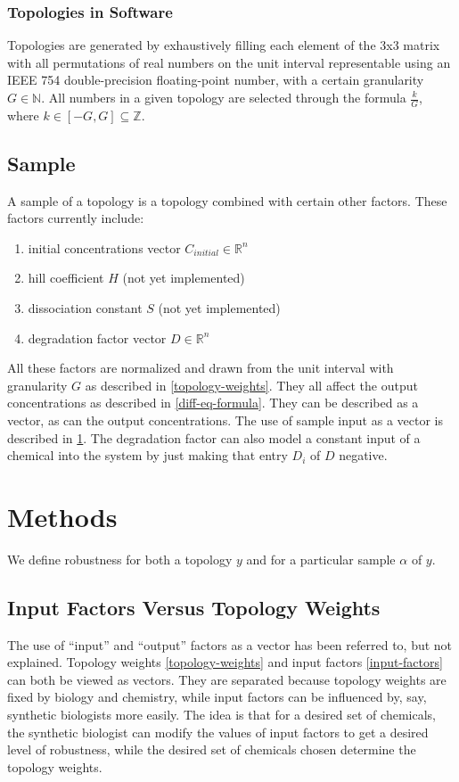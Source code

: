 \documentclass{article}
\begin{document}
\subsubsection{Topologies in Software}
Topologies are generated by exhaustively filling each element of the 3x3 matrix with all permutations of real numbers on the unit interval representable using an IEEE 754 double-precision floating-point number, with a certain granularity $G \in \mathbb{N}$. All numbers in a given topology are selected through the formula $\frac{k}{G}$, where $k \in [-G,G] \subseteq \mathbb{Z}$.

\subsection{Sample}
A sample of a topology is a topology combined with certain other factors. These factors currently include:

\begin{enumerate} \label{input-factors}
\item initial concentrations vector $C_{initial} \in \mathbb{R}^n$
\item hill coefficient $H$ (not yet implemented) \cite{igem-hill-coefficients}
\item dissociation constant $S$ (not yet implemented) \cite{igem-hill-coefficients}
\item degradation factor vector $D \in \mathbb{R}^n$
\end{enumerate}

All these factors are normalized and drawn from the unit interval with granularity $G$ as described in \ref{topology-weights}. They all affect the output concentrations as described in \eqref{diff-eq-formula}. They can be described as a vector, as can the output concentrations. The use of sample input as a vector is described in \ref{statistic-analysis}. The degradation factor can also model a constant input of a chemical into the system by just making that entry $D_i$ of $D$ negative.

\section{Methods} \label{statistic-analysis}
We define robustness for both a topology $y$ and for a particular sample $\alpha$ of $y$.

\subsection{Input Factors Versus Topology Weights}
The use of ``input'' and ``output'' factors as a vector has been referred to, but not explained. Topology weights \ref{topology-weights} and input factors \ref{input-factors} can both be viewed as vectors. They are separated because topology weights are fixed by biology and chemistry, while input factors can be influenced by, say, synthetic biologists more easily. The idea is that for a desired set of chemicals, the synthetic biologist can modify the values of input factors to get a desired level of robustness, while the desired set of chemicals chosen determine the topology weights.
\end{document}
